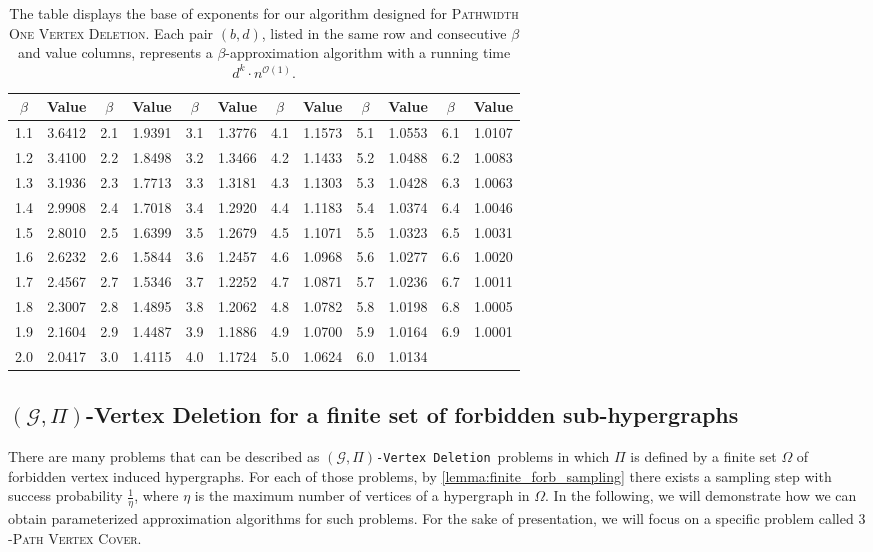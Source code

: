 \documentclass[letterpaper,11pt]{article}
\newcommand{\1}[1]{\mathds{1}\left[#1\right]}
\newcommand{\Oh}{\mathcal{O}}
\newcommand{\nmgpivd}[1][\mathcal{G},\Pi]{$(#1)$\textnormal{\texttt{-Vertex Deletion}}}
\newcommand{\pathvc}[1]{\ensuremath{#1}\textsc{-Path Vertex Cover}\xspace}
\newcommand{\povd}{\textsc{Pathwidth One Vertex Deletion}\xspace}
\begin{document}
\begin{table}[h]
    \centering
    \begin{tabular}{|c|c|c|c|c|c|c|c|c|c|c|c|}
        \hline
        $\beta$ & Value & $\beta$ & Value & $\beta$ & Value & $\beta$ & Value & $\beta$ & Value & $\beta$ & Value \\
        \hline
        1.1 & 3.6412 & 2.1 & 1.9391 & 3.1 & 1.3776 & 4.1 & 1.1573 & 5.1 & 1.0553 & 6.1 & 1.0107 \\
        \hline
        1.2 & 3.4100 & 2.2 & 1.8498 & 3.2 & 1.3466 & 4.2 & 1.1433 & 5.2 & 1.0488 & 6.2 & 1.0083 \\
        \hline
        1.3 & 3.1936 & 2.3 & 1.7713 & 3.3 & 1.3181 & 4.3 & 1.1303 & 5.3 & 1.0428 & 6.3 & 1.0063 \\
        \hline
        1.4 & 2.9908 & 2.4 & 1.7018 & 3.4 & 1.2920 & 4.4 & 1.1183 & 5.4 & 1.0374 & 6.4 & 1.0046 \\
        \hline
        1.5 & 2.8010 & 2.5 & 1.6399 & 3.5 & 1.2679 & 4.5 & 1.1071 & 5.5 & 1.0323 & 6.5 & 1.0031 \\
        \hline
        1.6 & 2.6232 & 2.6 & 1.5844 & 3.6 & 1.2457 & 4.6 & 1.0968 & 5.6 & 1.0277 & 6.6 & 1.0020 \\
        \hline
        1.7 & 2.4567 & 2.7 & 1.5346 & 3.7 & 1.2252 & 4.7 & 1.0871 & 5.7 & 1.0236 & 6.7 & 1.0011 \\
        \hline
        1.8 & 2.3007 & 2.8 & 1.4895 & 3.8 & 1.2062 & 4.8 & 1.0782 & 5.8 & 1.0198 & 6.8 & 1.0005 \\
        \hline
        1.9 & 2.1604 & 2.9 & 1.4487 & 3.9 & 1.1886 & 4.9 & 1.0700 & 5.9 & 1.0164 & 6.9 & 1.0001 \\
        \hline
        2.0 & 2.0417 & 3.0 & 1.4115 & 4.0 & 1.1724 & 5.0 & 1.0624 & 6.0 & 1.0134 & & \\
        \hline
    \end{tabular}
    \caption{The table displays the base of exponents for our algorithm designed for \povd.
    Each pair $(b,d)$, listed in the same row and consecutive $\beta$ and value columns,
	represents a $\beta$-approximation algorithm with a running time $d^{k} \cdot n^{\Oh(1)}$.}
    \label{tab:povd}
\end{table}
 
\subsection{\boldmath $(\mathcal{G},\Pi)$-Vertex Deletion for a finite set of forbidden sub-hypergraphs}
\label{sec:pi_fixed_appl}
There are many problems that can be described as \nmgpivd\  problems in which
$\Pi$ is defined by a finite set $\Omega$ of forbidden vertex induced hypergraphs. For
each of those problems, by \cref{lemma:finite_forb_sampling} there exists a
sampling step with success probability $\frac{1}{\eta}$, where $\eta$ is the maximum
number of vertices of a hypergraph in $\Omega$. In the following, we will demonstrate
how we can obtain parameterized approximation algorithms for such problems.
For the sake of presentation, we will focus on a specific problem called \pathvc{3}.
\end{document}
